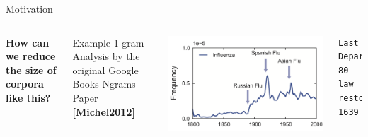 \documentclass[16:9,en,navbarinfooter]{sdqbeamer}
\begin{document}
\begin{frame}[fragile]{Motivation}
\begin{columns}
    \textbf{How can we reduce the size of corpora like this?}\\
    \begin{center}
    \tiny
        Example 1-gram Analysis by the original Google Books Ngrams Paper \textbf{[Michel2012]}
    \end{center}
    \includegraphics[width=\linewidth]{influenza}
\lstset{
frame = single,  
framexleftmargin=1pt}
\begin{lstlisting}[title={Sample of 2-grams.tsv}]
Last	Departure	80
law	restored	1639
\end{lstlisting}
\end{columns}
\end{frame}
\end{document}
